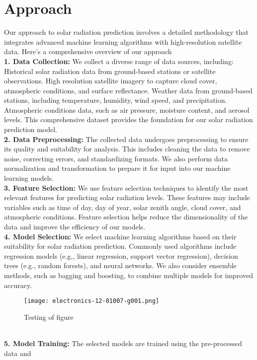 \documentclass[12pt,a4paper]{report}
\begin{document}
\section{Approach}
Our approach to solar radiation prediction involves a detailed methodology that 
integrates advanced machine learning algorithms with high-resolution satellite data. 
Here's a comprehensive overview of our approach \\
\textbf{1. Data Collection:} We collect a diverse range of data sources, including: Historical 
solar radiation data from ground-based stations or satellite observations. High
resolution satellite imagery to capture cloud cover, atmospheric conditions, and 
surface reflectance. Weather data from ground-based stations, including temperature, 
humidity, wind speed, and precipitation. Atmospheric conditions data, such as air 
pressure, moisture content, and aerosol levels. This comprehensive dataset provides 
the foundation for our solar radiation prediction model.\\ 
\textbf{2. Data Preprocessing:} The collected data undergoes preprocessing to ensure its 
quality and suitability for analysis. This includes cleaning the data to remove noise, 
correcting errors, and standardizing formats. We also perform data normalization and 
transformation to prepare it for input into our machine learning models. \\
\textbf{3. Feature Selection:} We use feature selection techniques to identify the most 
relevant features for predicting solar radiation levels. These features may include 
variables such as time of day, day of year, solar zenith angle, cloud cover, and 
atmospheric conditions. Feature selection helps reduce the dimensionality of the data 
and improve the efficiency of our models. \\
\textbf{4. Model Selection:} We select machine learning algorithms based on their suitability 
for solar radiation prediction. Commonly used algorithms include regression models 
(e.g., linear regression, support vector regression), decision trees (e.g., random 
forests), and neural networks. We also consider ensemble methods, such as bagging 
and boosting, to combine multiple models for improved accuracy. 
\begin{figure} [!ht]
    \centering
    \texttt{[image: electronics-12-01007-g001.png]}
    \caption{Testing of figure}
    \label{fig:enter-label}
\end{figure}\\
\textbf{5. Model Training:} The selected models are trained using the pre-processed data and 
\end{document}
